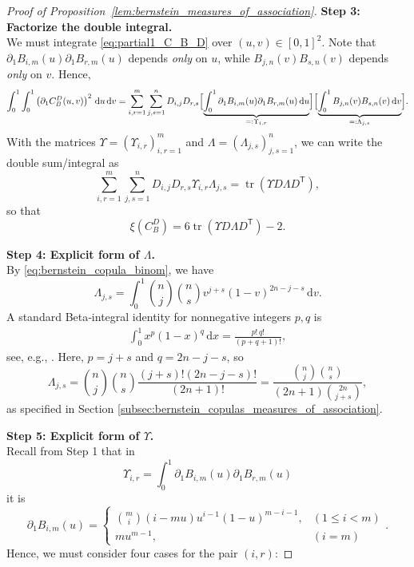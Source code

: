 \documentclass{article}
\theoremstyle{definition}
\DeclareMathOperator{\tr}{tr}  %
\newcommand{\de}{\mathrm{\,d}}
\begin{document}
\begin{proof}[Proof of Proposition~\ref{lem:bernstein_measures_of_association}]
\medskip
\noindent
\textbf{Step 3: Factorize the double integral.}\\
We must integrate \eqref{eq:partial1_C_B_D} over $(u,v)\in[0,1]^2$.
Note that
$\partial_1 B_{i,m}(u)\partial_1 B_{r,m}(u)$ depends \emph{only} on $u$,
while $B_{j,n}(v)B_{s,n}(v)$ depends \emph{only} on $v$.
Hence,
\small
\[
\int_0^1 \int_0^1 \left(\partial_1 C_B^D(u,v)\right)^2\de u\de v
=\sum_{i,r=1}^m\sum_{j,s=1}^n  D_{i,j}D_{r,s}  \Bigl[
    \underbrace{
    \int_0^1 \partial_1 B_{i,m}(u)\partial_1 B_{r,m}(u)\de u }_{=:\Upsilon_{i,r}}
    \Bigr]\Bigl[
    \underbrace{ \int_0^1 B_{j,n}(v)B_{s,n}(v)\de v}_{=:\Lambda_{j,s}}
    \Bigr].
\]
\normalsize
With the matrices $\Upsilon = \left(\Upsilon_{i,r}\right)_{i,r=1}^m$ and $\Lambda = \left(\Lambda_{j,s}\right)_{j,s=1}^n$, we can write the double sum/integral as
\[
\sum_{i,r=1}^m\sum_{j,s=1}^n D_{i,j}D_{r,s}\Upsilon_{i,r}\Lambda_{j,s}
= \tr\left(\Upsilon D\Lambda D^{\mathsf{T}}\right),
\]
so that
\[
\xi\left(C_B^D\right)
=6\tr\left(\Upsilon D\Lambda D^{\mathsf{T}}\right)-2.
\]

\medskip
\noindent
\textbf{Step 4: Explicit form of \(\Lambda\).}\\
By \eqref{eq:bernstein_copula_binom}, we have
\[
    \Lambda_{j,s} = \int_0^1 \binom{n}{j}\binom{n}{s}  v^{j+s}(1-v)^{2n - j-s} \de v.
\]
A standard Beta‐integral identity for nonnegative integers $p,q$ is
\begin{align}\label{eq:beta_integral}
    \int_0^1 x^p (1-x)^q \de x = \frac{p!\,q!}{(p+q+1)!}
,\end{align}
see, e.g., \cite{weisstein2002beta}.
Here, $p = j+s$ and $q = 2n - j-s$, so
\[
    \Lambda_{j,s}
    =\binom{n}{j}\binom{n}{s}\frac{(j+s)!\left(2n - j-s\right)!}{(2n+1)!}
    =\frac{\binom{n}{j}\binom{n}{s}}{(2n+1)\binom{2n}{j+s}},
\]
as specified in Section \ref{subsec:bernstein_copulas_measures_of_association}.

\medskip
\noindent
\textbf{Step 5: Explicit form of \(\Upsilon\).}\\
Recall from Step 1 that in
\[
    \Upsilon_{i,r} = \int_0^1 \partial_1 B_{i,m}(u)\partial_1 B_{r,m}(u)
\]
it is
\[
\partial_1 B_{i,m}(u)
= \begin{cases}
  \binom{m}{i}(i - mu) u^{i-1}(1-u)^{m-i-1}, & (1 \le i < m) \\[0.75em]
  mu^{m-1}, & (i=m)
\end{cases}
.\]
Hence, we must consider four cases for the pair \((i,r)\):


\end{proof}
\end{document}
